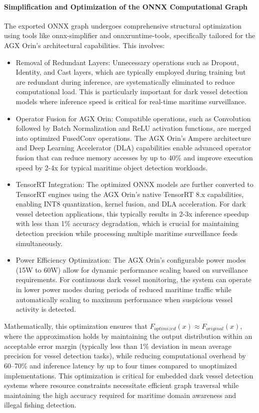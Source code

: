 \documentclass{article}
\begin{document}
	\paragraph{Simplification and Optimization of the ONNX Computational Graph}
	The exported ONNX graph undergoes comprehensive structural optimization using tools like onnx-simplifier and onnxruntime-tools, specifically tailored for the AGX Orin's architectural capabilities. This involves:
	\begin{itemize}
		\item 	Removal of Redundant Layers: Unnecessary operations such as Dropout, Identity, and Cast layers, which are typically employed during training but are redundant during inference, are systematically eliminated to reduce computational load. This is particularly important for dark vessel detection models where inference speed is critical for real-time maritime surveillance.
		\item 	Operator Fusion for AGX Orin: Compatible operations, such as Convolution followed by Batch Normalization and ReLU activation functions, are merged into optimized FusedConv operations. The AGX Orin's Ampere architecture and Deep Learning Accelerator (DLA) capabilities enable advanced operator fusion that can reduce memory accesses by up to 40\% and improve execution speed by 2-4x for typical maritime object detection workloads.
		\item TensorRT Integration: The optimized ONNX models are further converted to TensorRT engines using the AGX Orin's native TensorRT 8.x capabilities, enabling INT8 quantization, kernel fusion, and DLA acceleration. For dark vessel detection applications, this typically results in 2-3x inference speedup with less than 1\% accuracy degradation, which is crucial for maintaining detection precision while processing multiple maritime surveillance feeds simultaneously.
		\item Power Efficiency Optimization: The AGX Orin's configurable power modes (15W to 60W) allow for dynamic performance scaling based on surveillance requirements. For continuous dark vessel monitoring, the system can operate in lower power modes during periods of reduced maritime traffic while automatically scaling to maximum performance when suspicious vessel activity is detected.
		
	\end{itemize}
	Mathematically, this optimization ensures that $F_{optimized}(x)\approx F_{original}(x)$, where the approximation holds by maintaining the output distribution within an acceptable error margin (typically less than 1\% deviation in mean average precision for vessel detection tasks), while reducing computational overhead by 60–70\% and inference latency by up to four times compared to unoptimized implementations. 
	This optimization is critical for embedded dark vessel detection systems where resource constraints necessitate efficient graph traversal while maintaining the high accuracy required for maritime domain awareness and illegal fishing detection. \\
	
\end{document}
